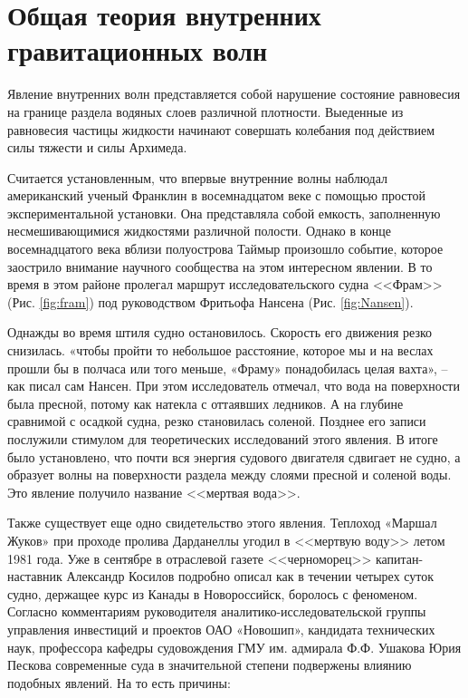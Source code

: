 \chapter{Общая теория внутренних гравитационных волн}
\label{cha:Theory}

Явление внутренних волн представляется собой нарушение состояние равновесия на границе раздела водяных слоев различной плотности. Выеденные из равновесия частицы жидкости начинают совершать колебания под действием силы тяжести и силы Архимеда.

Считается установленным, что впервые внутренние волны наблюдал американский ученый Франклин в восемнадцатом веке с помощью простой экспериментальной установки. Она представляла собой емкость, заполненную несмешивающимися жидкостями различной полости\cite{Sudolski}. Однако в конце восемнадцатого века вблизи полуострова Таймыр произошло событие, которое заострило внимание научного сообщества на этом интересном явлении. В то время в этом районе пролегал маршрут исследовательского судна <<Фрам>>(Рис. \ref{fig:fram}) под руководством Фритьофа Нансена (Рис. \ref{fig:Nansen}).

Однажды во время штиля судно остановилось. Скорость его движения резко снизилась.  «чтобы пройти то небольшое расстояние, которое мы и на веслах прошли бы в полчаса или того меньше, «Фраму» понадобилась целая вахта», -- как писал сам Нансен. При этом исследователь отмечал, что вода на поверхности была пресной, потому как натекла с оттаявших ледников. А на глубине сравнимой с осадкой судна, резко становилась соленой. Позднее его записи послужили стимулом для теоретических исследований этого явления. В итоге было установлено, что почти вся энергия судового двигателя сдвигает не судно, а образует волны на поверхности раздела между слоями пресной и соленой воды. Это явление получило название <<мертвая вода>>.

Также существует еще одно свидетельство этого явления. Теплоход «Маршал Жуков» при проходе пролива Дарданеллы угодил в <<мертвую воду>> летом 1981 года. Уже в сентябре в отраслевой газете <<черноморец>> капитан-наставник Александр Косилов подробно описал как в течении четырех суток судно, держащее курс из Канады в Новороссийск, боролось с феноменом. Согласно комментариям руководителя аналитико-исследовательской группы управления инвестиций и проектов ОАО «Новошип», кандидата технических наук, профессора кафедры судовождения ГМУ им. адмирала Ф.Ф. Ушакова Юрия Пескова современные суда в значительной степени подвержены влиянию подобных явлений\cite{MorVest}. На то есть причины:

